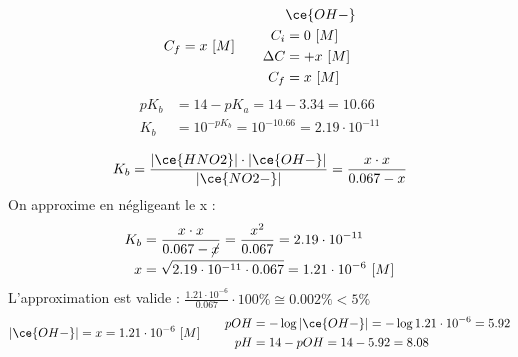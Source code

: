 \documentclass[
  11pt,
  a4paper,
  openany]{book}
\begin{document}
\begin{Answer}
\begin{enumerate}
\[\begin{split}
  C_f &= x\ [M] \\
  \end{split}
  \qquad
  \begin{split}
  &\ce{OH-}\\
  C_i &= 0\ [M] \\
  \Delta C &= + x\ [M] \\
  C_f &= x\ [M] \\
  \end{split}
  \]
  \[
  \begin{split}
  pK_b &= 14 - pK_a = 14 - 3.34 = 10.66 \\
  K_b &= 10^{-pK_b} = 10^{-10.66} = 2.19 \cdot 10^{-11} \\
  \end{split}
  \]
  \[
  K_b = \frac{|\ce{HNO2}| \cdot |\ce{OH-}|}{|\ce{NO2-}|} = \frac{x \cdot x}{0.067 - x}
  \]
  On approxime en négligeant le x :
  \[
  \begin{split}
  K_b &= \frac{x \cdot x}{0.067 - \cancel{x}} = \frac{x^2}{0.067} = 2.19 \cdot 10^{-11} \\
  x &= \sqrt{2.19 \cdot 10^{-11} \cdot 0.067} = 1.21 \cdot 10^{-6}\ [M]
  \end{split}
  \]
  L'approximation est valide : \(\frac{1.21 \cdot 10^{-6}}{0.067} \cdot 100\% \cong 0.002\% < 5\%\)
  \[
  \begin{split}
  |\ce{OH-}| = x = 1.21 \cdot 10^{-6}\ [M] 
  \end{split}
  \qquad
  \begin{split}
  pOH &= - \log |\ce{OH-}| = - \log 1.21 \cdot 10^{-6} = 5.92 \\
  pH &= 14 - pOH = 14 - 5.92 = 8.08
  \end{split}
  \]
\end{enumerate}

\end{Answer}
\end{document}
